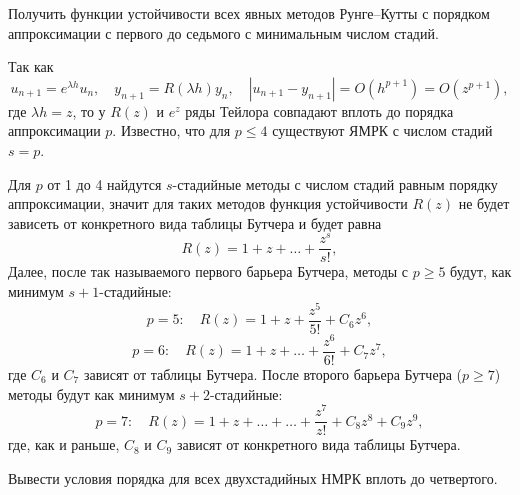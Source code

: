 \documentclass[a4paper]{article}
\begin{document}
\begin{hiProb}[7.2]
Получить функции устойчивости всех явных методов Рунге–Кутты с порядком аппроксимации с первого до седьмого с минимальным числом стадий.
\end{hiProb}
\begin{sol}
Так как
\[
u_{n+1}=e^{\lambda h} u_n,\quad y_{n+1}=
R(\lambda h) y_n,\quad |u_{n+1}-y_{n+1}|=O\left(h^{p+1}\right)=
O\left(z^{p+1}\right)
,\] 
где $\lambda h=z$, то у $R(z)$ и $e^z$ ряды Тейлора
совпадают вплоть до порядка аппроксимации $p$.
Известно, что для $p\le 4$ существуют ЯМРК
с числом стадий $s=p$.

Для $p$ от 1 до 4 найдутся  $s$-стадийные методы
с числом стадий равным порядку аппроксимации,
значит для таких методов функция устойчивости
$R(z)$ не будет зависеть от конкретного вида
таблицы Бутчера и будет равна
\[
	R (z)=1+z+\ldots+\frac{z^s}{s!},
\] 
Далее, после так называемого первого барьера Бутчера,
методы с $p\ge 5$ будут, как минимум $s+1$-стадийные:
\[
	p=5:\quad R(z)=1+z+ \frac{z^5}{5!}+ C_6 z^6,
\] 
\[
	p=6:\quad R(z)=1+z+\ldots+\frac{z^6}{6!}+
	C_7 z^7
,\] 
где $C_6$ и $C_7$ зависят от таблицы Бутчера.
После второго барьера Бутчера ($p\ge 7$) методы
будут как минимум $s+2$-стадийные:
\[
p=7:\quad	R(z)=1+z+\ldots+\ldots+\frac{z^7}{z!}+
	C_8 z^8 +C_9 z^9
,\]
где, как и раньше, $C_8$ и $C_9$ зависят от конкретного
вида таблицы Бутчера.
\end{sol}
\begin{hiProb}[7.3]
Вывести условия порядка для всех двухстадийных НМРК вплоть до четвертого.
\end{hiProb}
\end{document}
